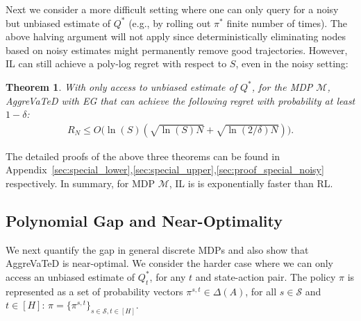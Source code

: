 \documentclass{article}
\newtheorem{theorem}{Theorem}[section]
\begin{document}
Next we consider a more difficult setting where one can only query for a noisy but unbiased estimate of $Q^*$ (e.g., by rolling out $\pi^*$ finite number of times). The above halving argument will not apply since deterministically eliminating nodes based on noisy estimates  might permanently remove good trajectories. However, IL can still achieve a poly-log regret with respect to $S$, even in the noisy setting:
\begin{theorem}
\label{them:special_lower_noisy}
With only access to unbiased estimate of $Q^*$, for the MDP ${\mathcal{M}}$, AggreVaTeD with EG that can achieve the following regret with probability at least $1-\delta$:
\begin{align}
R_N \leq O\Big(\ln(S)(\sqrt{\ln(S)N}+\sqrt{\ln(2/\delta)N})\Big).
\end{align}
\end{theorem} %
The detailed proofs of the above three theorems can be found in Appendix~\ref{sec:special_lower},\ref{sec:special_upper},\ref{sec:proof_special_noisy} respectively. %
In summary, for MDP ${\mathcal{M}}$, IL is is exponentially faster than RL. 

\subsection{Polynomial Gap and Near-Optimality}
We next quantify the gap in general discrete MDPs and also show that AggreVaTeD is near-optimal. We consider the harder case where we can only access an unbiased estimate of $Q^*_t$, for any $t$ and state-action pair. The policy $\pi$ is represented as a set of probability vectors $\pi^{s,t}\in\Delta(A)$, for all $s \in\mathcal{S}$ and  $t\in[H]$: $\pi = \{\pi^{s,t}\}_{s\in\mathcal{S},t\in[H]}$. %

\end{document}
